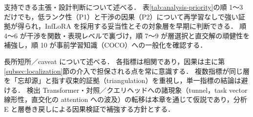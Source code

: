 支持できる主張・設計判断について述べる．
表\ref{tab:analysis-priority}の順 1〜3 だけでも，低ランク性（P1）と干渉の因果（P2）について再学習なしで強い証拠が得られ，InfLoRA を採用する妥当性とその対象層を早期に判断できる．
順 4〜6 が干渉を関数・表現レベルで裏づけ，順 7〜9 が層選択と直交解の頑健性を補強し，順 10 が事前学習知識（COCO）への一般化を確認する．

長所短所／caveat について述べる．
各指標は相関であり，因果は主に第\ref{subsec:localization}節の介入で担保される点を常に意識する．
複数指標が同じ層を「忘却源」と指す収束的証拠（triangulation）を重視し，単一指標の結論は避ける．
検出 Transformer・対照／クエリヘッドへの諸現象（tunnel，task vector 線形性，直交化の attention への波及）の転移は本章を通じて仮説であり，分析 E と層巻き戻しによる因果検証で補強する方針とする．

